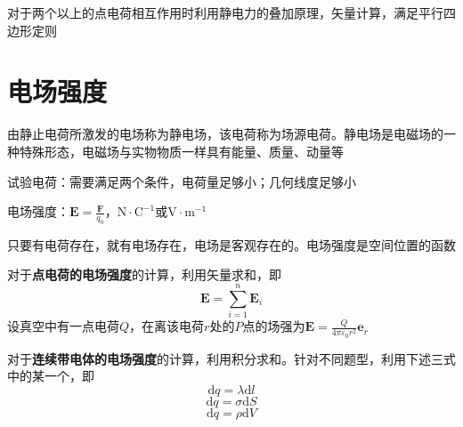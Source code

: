 \documentclass[12pt, a4paper, twoside]{ctexbook}
\begin{document}
对于两个以上的点电荷相互作用时利用静电力的叠加原理，矢量计算，满足平行四边形定则
\section{电场强度}
由静止电荷所激发的电场称为静电场，该电荷称为场源电荷。静电场是电磁场的一种特殊形态，电磁场与实物物质一样具有能量、质量、动量等

{\sonti 试验电荷}：需要满足两个条件，电荷量足够小；几何线度足够小

{\sonti 电场强度}：$\boldsymbol{E}=\frac{\boldsymbol{F}}{q_0}$，$\mathrm{N}\cdot\mathrm{C}^{-1}$或$\mathrm{V}\cdot\mathrm{m}^{-1}$

只要有电荷存在，就有电场存在，电场是客观存在的。电场强度是空间位置的函数

对于\textbf{点电荷的电场强度}的计算，利用矢量求和，即
$$
\boldsymbol{E}=\sum_{i=1}^{n}\boldsymbol{E}_i
$$
设真空中有一点电荷$Q$，在离该电荷$r$处的$P$点的场强为$\boldsymbol{E}=\frac{Q}{4\pi\varepsilon_0r^2}\boldsymbol{e}_r$

对于\textbf{连续带电体的电场强度}的计算，利用积分求和。针对不同题型，利用下述三式中的某一个，即
$$
\mathrm{d}q=\lambda \mathrm{d}l
$$
$$
\mathrm{d}q=\sigma \mathrm{d}S
$$
$$
\mathrm{d}q=\rho \mathrm{d}V
$$
\end{document}
